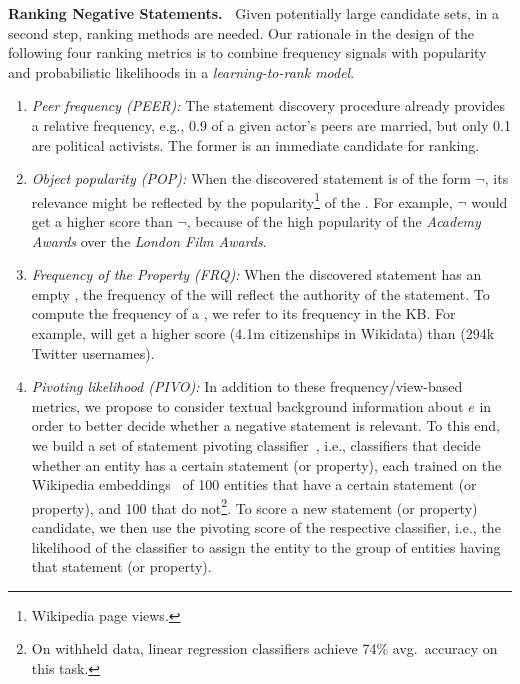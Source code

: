 \noindent
\textbf{Ranking Negative Statements.\ }
Given potentially large candidate sets, in a second step, ranking methods are needed. Our rationale in the design of the following four ranking metrics is to combine frequency signals with popularity and probabilistic likelihoods in a \emph{learning-to-rank model}.
\begin{enumerate}[noitemsep,topsep=0pt,parsep=0pt,partopsep=0pt]
\item \emph{Peer frequency (PEER):} The statement discovery procedure already provides a relative frequency, e.g., 0.9 of a given actor's peers are married, but only 0.1 are political activists. The former is an immediate candidate for ranking.
    \item \emph{Object popularity (POP):} When the discovered statement is of the form  $\neg$, its relevance might be reflected by the popularity\footnote{Wikipedia page views.} of the . For example, $\neg$ would get a higher score than $\neg$, because of the high popularity of the \textit{Academy Awards} over the \textit{London Film Awards}.
    \item \emph{Frequency of the Property (FRQ):} When the discovered statement has an empty  , the frequency of the  will reflect the authority of the statement. To compute the frequency of a , we refer to its frequency in the KB. For example,   will get a higher score (4.1m citizenships in Wikidata) than  (294k Twitter usern\-ames).
    \item \emph{Pivoting likelihood (PIVO):} In addition to these \linebreak frequency/view-based metrics, we propose to consider textual background information about $e$ in order to better decide whether a negative statement is relevant. To this end, we build a set of statement pivoting classifier~\cite{razniewski2017doctoral}, i.e., classifiers that decide whether an entity has a certain statement (or property), each trained on the Wikipedia embeddings~\cite{wikipedia2vec} of 100 entities that have a certain statement (or property), and 100 that do not\footnote{On withheld data, linear regression classifiers achieve 74\% avg.\ accuracy on this task.}. To score a new statement (or property) candidate, we then use the pivoting score of the respective classifier, i.e., the likelihood of the classifier to assign the entity to the group of entities having that statement (or property).
\end{enumerate}

